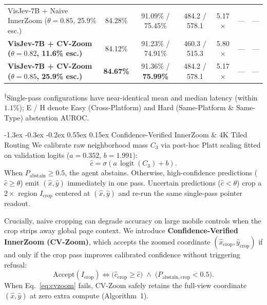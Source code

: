 \documentclass[10pt,twocolumn,letterpaper]{article}
\makeatletter
\renewcommand\subsection{\@startsection{subsection}{2}{\z@}%
  {-1.3ex \@plus -0.3ex \@minus -0.2ex}%
  {0.55ex \@plus 0.15ex}%
  {\normalfont\normalsize\bfseries\color{navy!85!black}}}
\DeclareMathOperator{\logit}{logit}
\makeatother
\begin{document}
\begin{table}[t]
\begin{tabular}{@{}lcccccc@{}}
VisJev-7B + Naive InnerZoom ($\theta{=}0.85$, 25.9\% esc.) & 84.28\% & 91.09\% / 75.45\% & 484.2 / 578.1 & 5.17$\times$ & --- & --- \\
\rowcolor{rowhl}
\textbf{VisJev-7B + CV-Zoom ($\theta{=}0.82$, 11.6\% esc.)} & 84.12\% & 91.23\% / 74.91\% & 460.3 / 515.3 & 5.80$\times$ & --- & --- \\
\rowcolor{rowhl}
\textbf{VisJev-7B + CV-Zoom ($\theta{=}0.85$, 25.9\% esc.)} & \textbf{84.67\%} & 91.36\% / \textbf{75.99\%} & 484.2 / 578.1 & 5.17$\times$ & --- & --- \\
\bottomrule
\end{tabular}
\begin{flushleft}
\vspace{-4pt}
{\scriptsize \textsuperscript{$\dagger$}Single-pass configurations have near-identical mean and median latency (within $1.1\%$); E / H denote Easy (Cross-Platform) and Hard (Same-Platform \& Same-Type) abstention AUROC.}
\end{flushleft}
\end{table}

\subsection{Confidence-Verified InnerZoom \& 4K Tiled Routing}
We calibrate raw neighborhood mass $C_3$ via post-hoc Platt scaling fitted on validation logits ($a{=}0.352$, $b{=}1.991$):
\begin{equation}
  \hat{c} = \sigma\!\left(a\,\logit(C_3) + b\right).
  \label{eq:platt}
\end{equation}
When $P_{\mathrm{abstain}} \ge 0.5$, the agent abstains. Otherwise, high-confidence predictions ($\hat{c} \ge \theta$) emit $(\hat{x},\hat{y})$ immediately in one pass. Uncertain predictions ($\hat{c} < \theta$) crop a $2{\times}$ region $I_{\mathrm{crop}}$ centered at $(\hat{x},\hat{y})$ and re-run the same single-pass pointer readout.

Crucially, naive cropping can degrade accuracy on large mobile controls when the crop strips away global page context. We introduce \textbf{Confidence-Verified InnerZoom (CV-Zoom)}, which accepts the zoomed coordinate $(\hat{x}_{\mathrm{crop}},\hat{y}_{\mathrm{crop}})$ if and only if the crop pass improves calibrated confidence without triggering refusal:
\begin{equation}
  \mathrm{Accept}(I_{\mathrm{crop}}) \iff \bigl(\hat{c}_{\mathrm{crop}} \ge \hat{c}\bigr) \;\land\; \bigl(P_{\mathrm{abstain,crop}} < 0.5\bigr).
  \label{eq:cvzoom}
\end{equation}
When Eq.~\eqref{eq:cvzoom} fails, CV-Zoom safely retains the full-view coordinate $(\hat{x},\hat{y})$ at zero extra compute (Algorithm~1).
\end{document}
